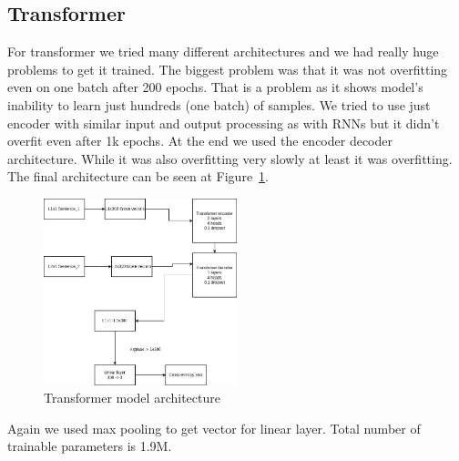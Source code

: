 \documentclass{article}
\begin{document}
    \subsection{Transformer}
    For transformer we tried many different architectures and we had really huge problems to get it trained.
    The biggest problem was that it was not overfitting even on one batch after 200 epochs.
    That is a problem as it shows model's inability to learn just hundreds (one batch) of samples.
    We tried to use just encoder with similar input and output processing as with RNNs but it didn't overfit even after 1k epochs.
    At the end we used the encoder decoder architecture. While it was also overfitting very slowly at least it was overfitting.
    The final architecture can be seen at Figure~\ref{fig:transformer_model}.
    \begin{figure}[h!]
        \centering
        \includegraphics[width=0.5\textwidth]{Transfomer.png}
        \caption{Transformer model architecture}
        \label{fig:transformer_model}
    \end{figure}

    Again we used max pooling to get vector for linear layer.
    Total number of trainable parameters is 1.9M.
\end{document}
